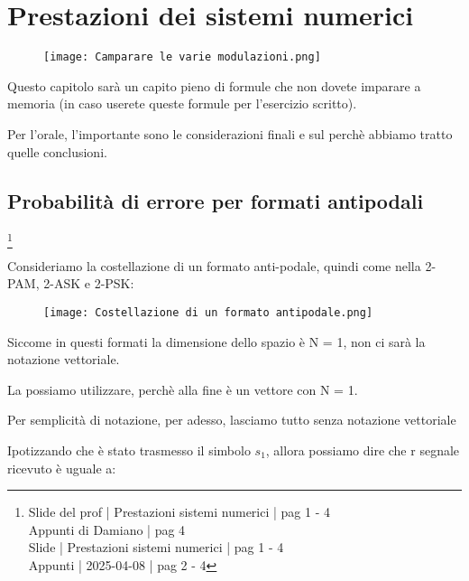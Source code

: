 \chapter{Prestazioni dei sistemi numerici}

\begin{figure}[h]
    \centering
    \texttt{[image: Camparare le varie modulazioni.png]}
\end{figure}

\newpage 

\begin{tcolorbox}
    Questo capitolo sarà un capito pieno di formule che non dovete imparare a memoria (in caso userete queste formule per l'esercizio scritto). \newline 

    Per l'orale, 
    l'importante sono le considerazioni finali e sul perchè abbiamo tratto quelle conclusioni.  
\end{tcolorbox}

\section{Probabilità di errore per formati antipodali}
\footnote{Slide del prof | Prestazioni sistemi numerici | pag 1 - 4\\
Appunti di Damiano | pag 4 \\
Slide | Prestazioni sistemi numerici | pag 1 - 4 \\
Appunti | 2025-04-08 | pag 2 - 4
}

Consideriamo la costellazione di un formato anti-podale, 
quindi come nella 2-PAM, 2-ASK e 2-PSK: 

\begin{figure}[h]
    \centering
    \texttt{[image: Costellazione di un formato antipodale.png]}
\end{figure}

\begin{tcolorbox}
    Siccome in questi formati la dimensione dello spazio è N = 1, 
    non ci sarà la notazione vettoriale. \newline 

    La possiamo utilizzare, perchè alla fine è un vettore con N = 1. \newline 

    Per semplicità di notazione, per adesso, lasciamo tutto senza notazione vettoriale
\end{tcolorbox}

Ipotizzando che è stato trasmesso il simbolo $s_1$, 
allora possiamo dire che r segnale ricevuto è uguale a: 

